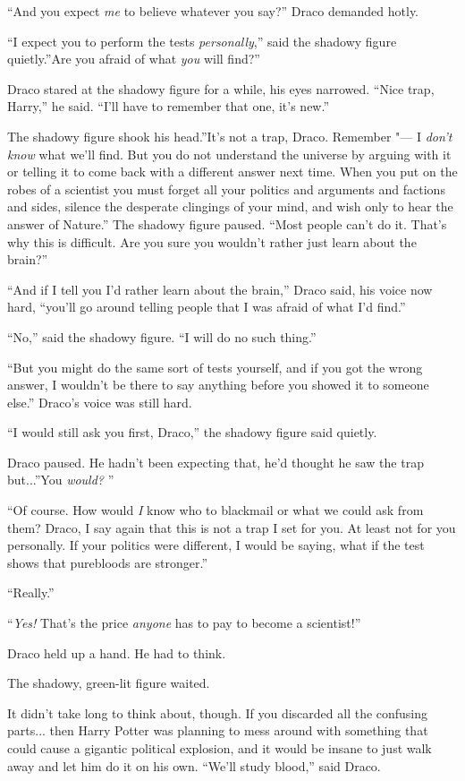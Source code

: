 ``And you expect \emph{me} to believe whatever you say?'' Draco demanded
hotly.

``I expect you to perform the tests \emph{personally},'' said the shadowy
figure quietly.''Are you afraid of what \emph{you} will find?''

Draco stared at the shadowy figure for a while, his eyes narrowed.
``Nice trap, Harry,'' he said. ``I'll have to remember that one, it's
new.''

The shadowy figure shook his head.''It's not a trap, Draco. Remember "--- I
\emph{don't know} what we'll find. But you do not understand the
universe by arguing with it or telling it to come back with a different
answer next time. When you put on the robes of a scientist you must
forget all your politics and arguments and factions and sides, silence
the desperate clingings of your mind, and wish only to hear the answer
of Nature.'' The shadowy figure paused. ``Most people can't do it.
That's why this is difficult. Are you sure you wouldn't rather just
learn about the brain?''

``And if I tell you I'd rather learn about the brain,'' Draco said, his
voice now hard, ``you'll go around telling people that I was afraid of
what I'd find.''

``No,'' said the shadowy figure. ``I will do no such thing.''

``But you might do the same sort of tests yourself, and if you got the
wrong answer, I wouldn't be there to say anything before you showed it
to someone else.'' Draco's voice was still hard.

``I would still ask you first, Draco,'' the shadowy figure said quietly.

Draco paused. He hadn't been expecting that, he'd thought he saw the
trap but...''You \emph{would?} ''

``Of course. How would \emph{I} know who to blackmail or what we could
ask from them? Draco, I say again that this is not a trap I set for you.
At least not for you personally. If your politics were different, I
would be saying, what if the test shows that purebloods are stronger.''

``Really.''

``\emph{Yes!} That's the price \emph{anyone} has to pay to become a
scientist!''

Draco held up a hand. He had to think.

The shadowy, green-lit figure waited.

It didn't take long to think about, though. If you discarded all the
confusing parts... then Harry Potter was planning to mess around
with something that could cause a gigantic political explosion, and it
would be insane to just walk away and let him do it on his own. ``We'll
study blood,'' said Draco.

